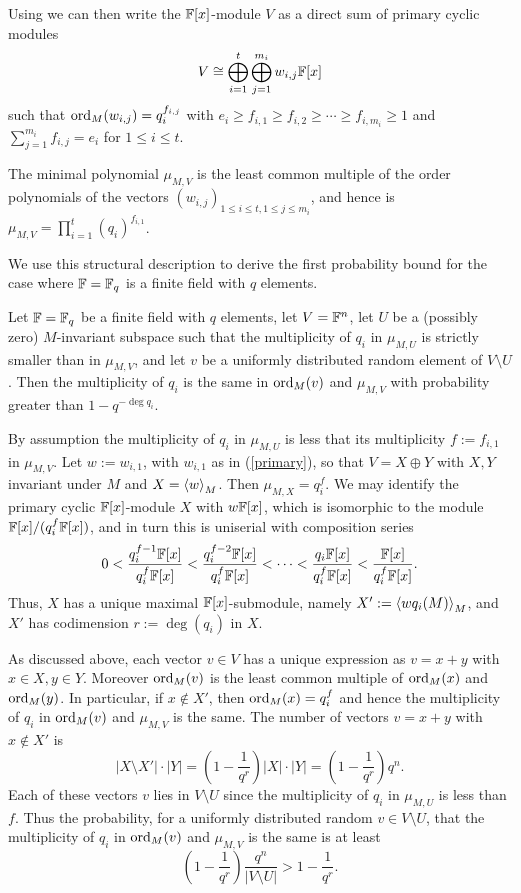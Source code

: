 Using \cite[Theorem 3.12]{Jacob1} we can then write the $\mathbb{F}[x]$-module $V$
as a direct sum of primary cyclic modules
\begin{equation} \label{primary}
V \cong \bigoplus_{i=1}^t \bigoplus_{j=1}^{m_i} w_{i,j} \F[x] 
\end{equation}
such that $\mathrm{ord}_M(w_{i,j}) = q_i^{f_{i,j}}$ with
$e_i \ge f_{i,1} \ge f_{i,2} \ge \cdots \ge f_{i,m_i} \ge 1$
and $\sum_{j=1}^{m_i} f_{i,j}=e_i$ for $1 \le i \le t$.

The minimal polynomial $\mu_{M,V}$ is the least
common multiple of the order polynomials of the vectors 
$(w_{i,j})_{1 \le i \le t, 1 \le j \le m_i}$, and hence is 
$\mu_{M,V} = \prod_{i=1}^t (q_i)^{f_{i,1}}$.

We use this structural description to derive the
first probability bound for the case where $\mathbb{F} = \mathbb{F}_q$ is a finite field
with $q$ elements.

\begin{Prop}
\label{ProbOneMult}

\mbox{}\par
Let $\mathbb{F} = \mathbb{F}_q$ be a finite field with $q$ elements, let $V=\mathbb{F}^n$, let
$U$ be a (possibly zero) $M$-invariant subspace such that the multiplicity of
$q_i$ in $\mu_{M,U}$ is strictly smaller than in $\mu_{M,V}$, and let 
$v$ be a uniformly distributed random element of $V\setminus U$. Then 
the multiplicity of $q_i$ is the same in $\mathrm{ord}_M(v)$ and $\mu_{M,V}$ 
with probability greater than
$1-q^{-\deg q_i}$.
\end{Prop}
\proofbeg
By assumption the multiplicity of $q_i$ in $\mu_{M,U}$ 
is less that its multiplicity $f:=f_{i,1}$ in $\mu_{M,V}$. 
Let $w:=w_{i,1}$, with $w_{i,1}$ as in (\ref{primary}), so that $V=X\oplus Y$ with
$X, Y$ invariant under $M$ and $X=\left< w\right>_M$. Then $\mu_{M,X}=
q_i^{f}$. We may identify the primary cyclic $\mathbb{F}[x]$-module 
$X$ with  $w\mathbb{F}[x]$, which is
isomorphic to the module $\mathbb{F}[x]/(q_i^{f}\mathbb{F}[x])$,
and in turn this is uniserial with composition series
\[ 
0 <   \frac{q_i^{f-1}\mathbb{F}[x]}{q_i^{f}\mathbb{F}[x]}
     <   \frac{q_i^{f-2}\mathbb{F}[x]}{q_i^{f}\mathbb{F}[x]} <
\cdots <  \frac{q_i\mathbb{F}[x]}{q_i^{f}\mathbb{F}[x]} 
       < \frac{\mathbb{F}[x]}{q_i^{f}\mathbb{F}[x]}. 
\]
Thus, $X$ has a unique maximal $\mathbb{F}[x]$-submodule, namely  $X':=\left< w q_i(M)\right>_M$,
and $X'$ has codimension $r:=\deg(q_i)$ in $X$. 

As discussed above, each vector $v\in V$ has a 
unique expression as $v=x+y$ with $x\in X, y\in Y$. Moreover
$\mathrm{ord}_M(v)$ is the least common multiple of $\mathrm{ord}_M(x)$ and $\mathrm{ord}_M(y)$.
In particular, if $x\not\in X'$, then $\mathrm{ord}_M(x)=q_i^{f}$ and hence
the multiplicity of $q_i$ in $\mathrm{ord}_M(v)$ and $\mu_{M,V}$ is the same.
The number of vectors $v=x+y$ with $x\not\in X'$ is 
\[
|X\setminus X'|\cdot |Y|=(1-\frac{1}{q^r})|X|\cdot|Y|=(1-\frac{1}{q^r})q^n.
\]
Each of these vectors $v$ lies in $V\setminus U$ since the multiplicity of
$q_i$ in $\mu_{M,U}$ is less than $f$. Thus the probability, for
a uniformly distributed random $v\in V\setminus U$, that the multiplicity 
of $q_i$ in $\mathrm{ord}_M(v)$ and $\mu_{M,V}$ is the same is at least
\[
(1-\frac{1}{q^r})\frac{q^n}{|V\setminus U|} > 1-\frac{1}{q^r}.
\]
\proofend

